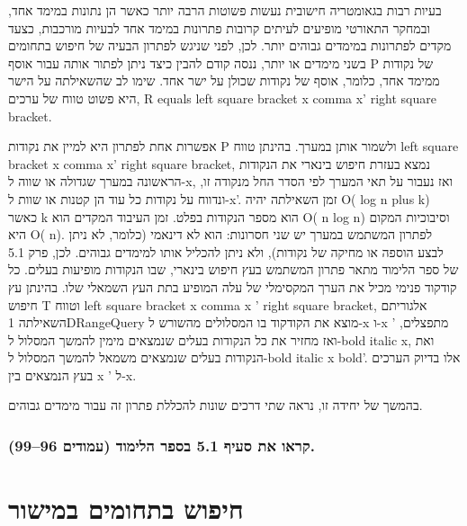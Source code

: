 \documentclass[
]{book}
\begin{document}
בעיות רבות בגאומטריה חישובית נעשות פשוטות הרבה יותר כאשר הן נתונות במימד אחד, ובמחקר התאורטי מופיעים לעיתים קרובות פתרונות במימד אחד לבעיות מורכבות, כצעד מקדים לפתרונות במימדים גבוהים יותר. לכן, לפני שניגש לפתרון הבעיה של חיפוש בתחומים בשני מימדים או יותר, ננסה קודם להבין כיצד ניתן לפתור אותה עבור אוסף P של נקודות ממימד אחד, כלומר, אוסף של נקודות שכולן על ישר אחד. שימו לב שהשאילתה על הישר היא פשוט טווח של ערכים, R equals left square bracket x comma x' right square bracket.

אפשרות אחת לפתרון היא למיין את נקודות P ולשמור אותן במערך. בהינתן טווח left square bracket x comma x' right square bracket, נמצא בעזרת חיפוש בינארי את הנקודות הראשונה במערך שגדולה או שווה ל-x, ואז נעבור על תאי המערך לפי הסדר החל מנקודה זו, ונדווח על נקודות כל עוד הן קטנות או שוות ל-x'. זמן השאילתה יהיה O( log n plus k) כאשר k הוא מספר הנקודות בפלט. זמן העיבוד המקדים הוא O( n log n) וסיבוכיות המקום היא O( n). לפתרון המשתמש במערך יש שני חסרונות: הוא לא דינאמי (כלומר, לא ניתן לבצע הוספה או מחיקה של נקודות), ולא ניתן להכליל אותו למימדים גבוהים. לכן, פרק 5.1 של ספר הלימוד מתאר פתרון המשתמש בעץ חיפוש בינארי, שבו הנקודות מופיעות בעלים. כל קודקוד פנימי מכיל את הערך המקסימלי של עלה המופיע בתת העץ השמאלי שלו. בהינתן עץ חיפוש T וטווח left square bracket x comma x ' right square bracket, אלגוריתם השאילתה 1DRangeQuery מוצא את הקודקוד בו המסלולים מהשורש ל-x ו-x ' מתפצלים, ואז מחזיר את כל הנקודות בעלים שנמצאים מימין להמשך המסלול ל-bold italic x, ואת הנקודות בעלים שנמצאים משמאל להמשך המסלול ל-bold italic x bold'. אלו בדיוק הערכים בעץ הנמצאים בין x ' ל-x.

בהמשך של יחידה זו, נראה שתי דרכים שונות להכללת פתרון זה עבור מימדים גבוהים.

\hypertarget{ux5e7ux5e8ux5d0ux5d5-ux5d0ux5ea-ux5e1ux5e2ux5d9ux5e3-5.1-ux5d1ux5e1ux5e4ux5e8-ux5d4ux5dcux5d9ux5deux5d5ux5d3-ux5e2ux5deux5d5ux5d3ux5d9ux5dd-9699.}{%
\subsubsection*{קראו את סעיף 5.1 בספר הלימוד (עמודים 96--99).}\label{ux5e7ux5e8ux5d0ux5d5-ux5d0ux5ea-ux5e1ux5e2ux5d9ux5e3-5.1-ux5d1ux5e1ux5e4ux5e8-ux5d4ux5dcux5d9ux5deux5d5ux5d3-ux5e2ux5deux5d5ux5d3ux5d9ux5dd-9699.}}

\hypertarget{in-the-plane}{%
\section{חיפוש בתחומים במישור}\label{in-the-plane}}
\end{document}

